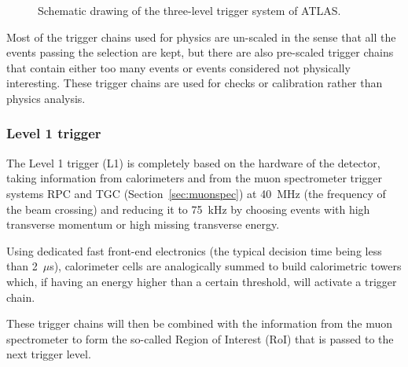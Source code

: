 \begin{figure}[tb]\begin{center}
	\caption{Schematic drawing of the three-level trigger system of ATLAS.\label{fig:trigger}}
\end{center}\end{figure}

Most of the trigger chains used for physics are un-scaled in the
sense that all the events passing the selection are kept, but there
are also pre-scaled trigger chains that contain either too many events
or events considered not physically interesting. These trigger chains
are used for checks or calibration rather than physics analysis.


\subsubsection{Level 1 trigger}\label{sec:lvl1}

The Level 1 trigger (L1) is completely based on the hardware of the detector,
taking information from calorimeters and from the muon spectrometer trigger
systems RPC and TGC (Section~\ref{sec:muonspec}) at 40~MHz (the frequency of
the beam crossing) and reducing it to 75~kHz by choosing events with high
transverse momentum or high missing transverse energy.

Using dedicated fast front-end electronics (the typical decision time being less than
2~$\mu$s), calorimeter cells are analogically 
summed to build calorimetric towers which, if having an energy higher than a 
certain threshold, will activate a trigger chain.

These trigger chains will then be combined with the information from the
muon spectrometer to form the so-called Region of Interest (RoI) that is
passed to the next trigger level.


